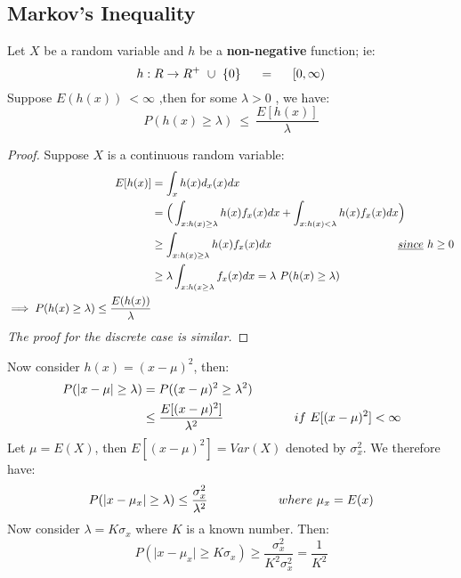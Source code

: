 \documentclass[11pt,twoside,a4paper,fleqn]{article}
\theoremstyle{plain}
\begin{document}
\subsection{Markov's Inequality}
Let $X$ be a random variable and $h$ be a \textbf{non-negative} function; ie:
	\begin{equation*}
	h:R->R^{+}\ \cup\ \{0\}\tab[0.5cm]=\tab[0.5cm] [0,\infty)
	\end{equation*}
Suppose $E(h(x))\ < \infty$ ,then for some $\lambda > 0$ , we have:
	\begin{equation}
	P(h(x) \geq \lambda)\ \leq\ \frac{E[h(x)]}{\lambda}
	\end{equation}
\begin{proof}
Suppose $X$ is a continuous random variable:
	\begin{equation*}
	\begin{split}
	E[h(x)] &= \int_{x} h(x)d_x(x)dx \\
		&=\Big(\int_{x:h(x)\geq\lambda}h(x)f_x(x)dx + \int_{x:h(x) < \lambda}h(x)f_x(x)dx\Big) \\
		&\geq \int_{x:h(x)\geq\lambda}h(x)f_x(x)dx\tab[4cm] \underline{since}\ h\geq 0\\
		&\geq\lambda \int_{x:h(x\geq\lambda}f_x(x)dx = \lambda\ P(h(x)\geq \lambda)\\
		\implies P(h(x)\geq \lambda) \leq \frac{E(h(x))}{\lambda}
	\end{split}
	\end{equation*}
\emph{The proof for the discrete case is similar.}
\end{proof} \hfill\newline
Now consider $h(x) = (x-\mu)^2$, then:
	\begin{equation*}
	\begin{split}
	P(\vert x-\mu \vert \geq \lambda) &= P((x-\mu)^2 \geq \lambda^2)\\
		&\leq \frac{E[(x-\mu)^2]}{\lambda^2}\tab[2cm]if\ E[(x-\mu)^2]<\infty
	\end{split}
	\end{equation*}
Let $\mu = E(X)$, then $E[(x-\mu)^2] = Var(X)$ denoted by $\sigma_x^2$. We therefore have:
	\begin{equation}
		P(\vert x-\mu_x \vert \geq \lambda) \leq \frac{\sigma_x^2}{\lambda^2}\tab[2cm] where\ \mu_x = E(x)
	\end{equation}
Now consider $\lambda= K\sigma_x$ where $K$ is a known number. Then:
	\begin{equation}
		P(\vert x-\mu_x\vert \geq K\sigma_x) \geq \frac{\sigma_x^2}{K^2\sigma_x^2}=\frac{1}{K^2}
	\end{equation}
\end{document}
